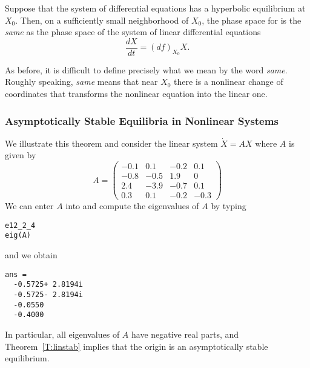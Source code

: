 \documentclass{ximera}
\begin{document}
\begin{thm}  \label{T:nlinearization}
Suppose that the system of differential equations  has a 
hyperbolic equilibrium at $X_0$.  Then, on a sufficiently small neighborhood 
of $X_0$, the phase space for  is the {\em same\/} as the phase 
space of the system of linear differential equations
\begin{equation}  \label{e:nlinearizedeqn}
\frac{dX}{dt} = (df)_{X_0}X.
\end{equation}
\end{thm} 

As before, it is difficult to define precisely what we mean by the word
{\em same\/}. Roughly speaking, {\em same\/} means that near $X_0$ there 
is a nonlinear change of coordinates
that transforms the nonlinear equation into the linear one.

\subsubsection*{Asymptotically Stable Equilibria in Nonlinear Systems}

We illustrate this theorem and consider the linear system 
$\dot{X}=AX$ where $A$ is given by
\begin{equation*}  \label{eq:fexam4}
A = 
\left(\begin{array}{rrrr}
   -0.1 &  0.1 & -0.2 &  0.1\\
   -0.8 & -0.5 &  1.9 &    0\\
    2.4 & -3.9 & -0.7 &  0.1\\
    0.3 &  0.1 & -0.2 & -0.3
\end{array}\right)
\end{equation*}
We can enter $A$ into \Matlab and compute the eigenvalues of $A$ by typing 
\begin{verbatim}
e12_2_4
eig(A)
\end{verbatim}
and we obtain
\begin{verbatim}
ans =
  -0.5725+ 2.8194i
  -0.5725- 2.8194i
  -0.0550         
  -0.4000         
\end{verbatim}
In particular, all eigenvalues of $A$ have negative real parts, and 
Theorem~\ref{T:linstab} implies that the origin is an asymptotically 
stable equilibrium.
\end{document}
